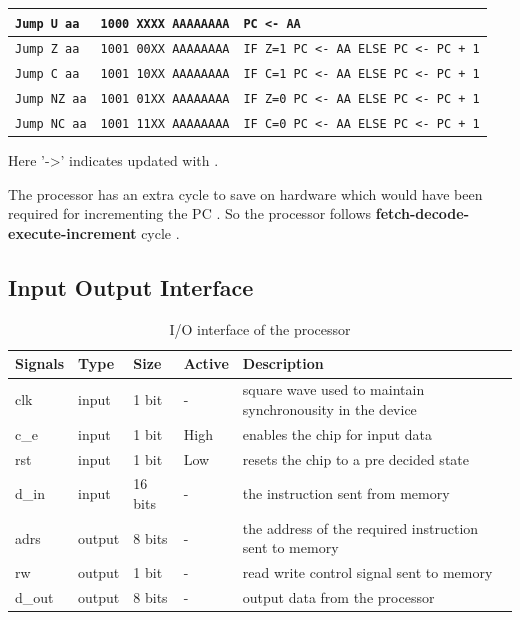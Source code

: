 \documentclass[11pt]{article}
\begin{document}
\begin{longtable}{|l|l|l|}
              \texttt{Jump U aa} &  \texttt{1000 XXXX AAAAAAAA} & \texttt{PC <- AA} \\ \hline
              
              \texttt{Jump Z aa} &  \texttt{1001 00XX AAAAAAAA} & \texttt{IF Z=1 PC <- AA ELSE PC <- PC + 1} \\ \hline
              
              \texttt{Jump C aa} &  \texttt{1001 10XX AAAAAAAA} & \texttt{IF C=1 PC <- AA ELSE PC <- PC + 1} \\ \hline
              
              \texttt{Jump NZ aa} &  \texttt{1001 01XX AAAAAAAA} & \texttt{IF Z=0 PC <- AA ELSE PC <- PC + 1} \\ \hline
              
              \texttt{Jump NC aa} &  \texttt{1001 11XX AAAAAAAA} & \texttt{IF C=0 PC <- AA ELSE PC <- PC + 1}\\ \hline
              
\end{longtable}


Here '->' indicates updated with .

The processor has an extra cycle to save on hardware which would have been required for incrementing the PC . So the processor follows \textbf{fetch-decode-execute-increment} cycle .   
\vspace*{40mm}
\subsection{Input Output Interface}
\begin{table}[H]
  \begin{center}
    \caption{I/O interface of the processor}  
    \vspace*{5mm}
    \begin{tabularx}{\linewidth}{||l|l|l||l|X||}
      \hline
          {\bf Signals} & { \bf Type } & {\bf Size} & {\bf Active} &{\bf Description}   \\ \hline
            clk          & input  & 1 bit   & -     &  square wave used to maintain synchronousity in the device \\ \hline
            c\_e         & input  & 1 bit   & High  &  enables the chip for input data  \\ \hline
            rst          & input  & 1 bit   & Low   &  resets the chip to a pre decided state \\ \hline
            [15:0] d\_in & input  & 16 bits & -     &  the instruction sent from memory \\ \hline
            [7:0] adrs   & output & 8 bits  & -     &  the address of the required instruction sent to memory \\ \hline
            rw           & output & 1 bit   & -     &  read write control signal sent to memory \\ \hline
            [7:0] d\_out & output & 8 bits  & -     &  output data from the processor \\ \hline
    \end{tabularx}
  \end{center}
\end{table}
\end{document}
